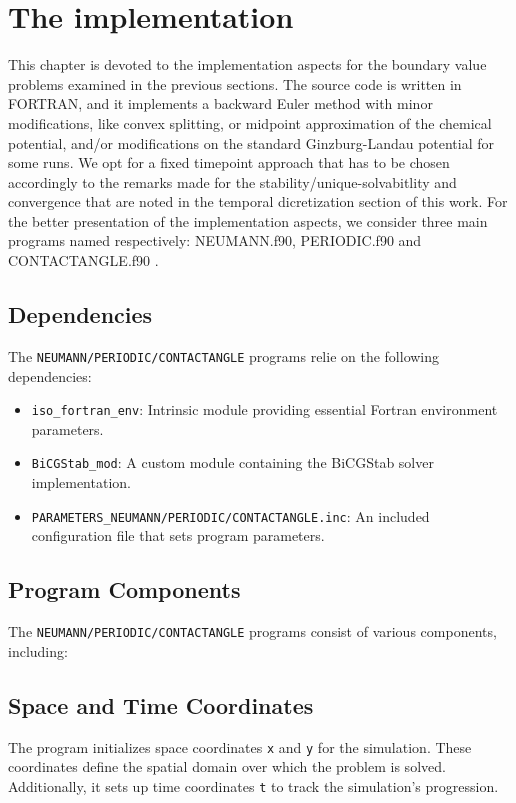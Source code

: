 \documentclass{article}
\begin{document}
\vfill
\clearpage

\newpage


\section{The implementation}
This chapter is devoted to the implementation aspects for the boundary value problems examined in the previous sections. The source code is written in FORTRAN, and it implements a backward Euler method with minor modifications, like convex splitting, or midpoint approximation of the chemical potential, and/or modifications on the standard Ginzburg-Landau potential for some runs. We opt for a fixed timepoint approach that has to be chosen accordingly to the remarks made for the stability/unique-solvabitlity and convergence that are noted in the temporal dicretization section of this work. For the better presentation of the implementation aspects, we consider three main programs named respectively: NEUMANN.f90, PERIODIC.f90 and CONTACTANGLE.f90 .

\subsection{Dependencies}
The \texttt{NEUMANN/PERIODIC/CONTACTANGLE} programs relie on the following dependencies:
\begin{itemize}
    \item \texttt{iso\_fortran\_env}: Intrinsic module providing essential Fortran environment parameters.
    \item \texttt{BiCGStab\_mod}: A custom module containing the BiCGStab solver implementation.
    \item \texttt{PARAMETERS\_NEUMANN/PERIODIC/CONTACTANGLE.inc}: An included configuration file that sets program parameters.
\end{itemize}

\subsection{Program Components}
The \texttt{NEUMANN/PERIODIC/CONTACTANGLE} programs consist of various components, including:

\subsection{Space and Time Coordinates}
The program initializes space coordinates \texttt{x} and \texttt{y} for the simulation. These coordinates define the spatial domain over which the problem is solved. Additionally, it sets up time coordinates \texttt{t} to track the simulation's progression.
\end{document}
